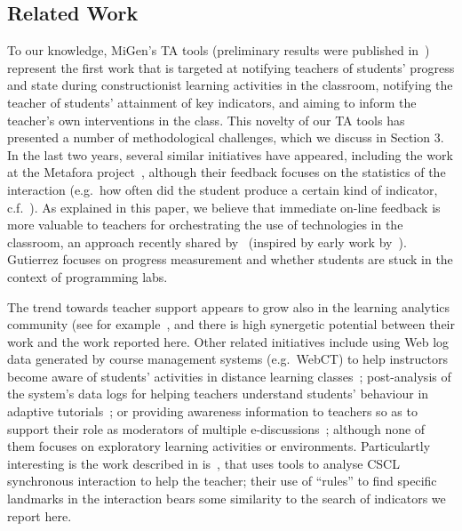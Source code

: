 \subsection{Related Work}
\label{sec:related}

To our knowledge, MiGen's TA tools (preliminary results were published
in~\cite{TA-ECTEL}) represent the first work that is targeted at
notifying teachers of students’ progress and state during constructionist
learning activities in the classroom, notifying the teacher of
students’ attainment of key indicators, and aiming to inform the
teacher’s own interventions in the class. This novelty of our TA tools
has presented a number of methodological challenges, which we discuss
in Section 3. In the last two years, several similar initiatives have
appeared, including the work at the Metafora
project~\cite{Dragon13}, although their
feedback focuses on the statistics of the interaction (e.g.~how often
did the student produce a certain kind of indicator, 
c.f.~\cite{Gueraud09}). As explained in
this paper, we believe that immediate on-line feedback is
more valuable to teachers for orchestrating the use of technologies in
the classroom, an approach recently shared by~\cite{Gutierrez12}
(inspired by early work by~\cite{Yardi08}). Gutierrez focuses on
progress measurement and whether students are stuck in the context of
programming labs. 

The trend towards teacher support appears to grow
also in the learning analytics community
(see for example~\cite{Crespo12,Zaldivar12,Pardo12}, and there is high
synergetic potential between their work and the work reported here.
Other related initiatives include 
using Web log data generated by course management systems
(e.g.~WebCT) to help instructors become aware of students’
activities in distance learning classes~\cite{Mazza07}; post-analysis of
the system's data logs for helping teachers understand students'
behaviour in adaptive tutorials~\cite{BenAnim08}; or providing
awareness information to teachers so as to support their role as 
moderators of multiple e-discussions~\cite{Wichmann09}; although none of them
focuses on exploratory learning activities or environments. 
Particulartly interesting is the work described in 
is~\cite{Avouris08}, that uses tools to analyse CSCL 
synchronous interaction to help the teacher; their use of ``rules'' to
find specific landmarks in the interaction bears some
similarity to the search of indicators we report here. 


